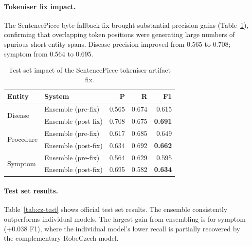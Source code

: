 \documentclass[11pt]{article}
\begin{document}
\paragraph{Tokeniser fix impact.}
The SentencePiece byte-fallback fix brought substantial precision gains
(Table~\ref{tab:cz-bugfix}), confirming that overlapping token positions were generating
large numbers of spurious short entity spans. Disease precision improved from 0.565 to
0.708; symptom from 0.564 to 0.695.

\begin{table}[h]
\centering
\small
\begin{tabular}{llrrr}
\toprule
\textbf{Entity} & \textbf{System} & \textbf{P} & \textbf{R} & \textbf{F1} \\
\midrule
\multirow{2}{*}{Disease}
  & Ensemble (pre-fix)  & 0.565 & 0.674 & 0.615 \\
  & Ensemble (post-fix) & 0.708 & 0.675 & \textbf{0.691} \\
\midrule
\multirow{2}{*}{Procedure}
  & Ensemble (pre-fix)  & 0.617 & 0.685 & 0.649 \\
  & Ensemble (post-fix) & 0.634 & 0.692 & \textbf{0.662} \\
\midrule
\multirow{2}{*}{Symptom}
  & Ensemble (pre-fix)  & 0.564 & 0.629 & 0.595 \\
  & Ensemble (post-fix) & 0.695 & 0.582 & \textbf{0.634} \\
\bottomrule
\end{tabular}
\caption{Test set impact of the SentencePiece tokeniser artifact fix.}
\label{tab:cz-bugfix}
\end{table}

\paragraph{Test set results.}
Table~\ref{tab:cz-test} shows official test set results. The ensemble consistently
outperforms individual models. The largest gain from ensembling is for symptom (+0.038 F1),
where the individual model's lower recall is partially recovered by the complementary
RobeCzech model.
\end{document}
